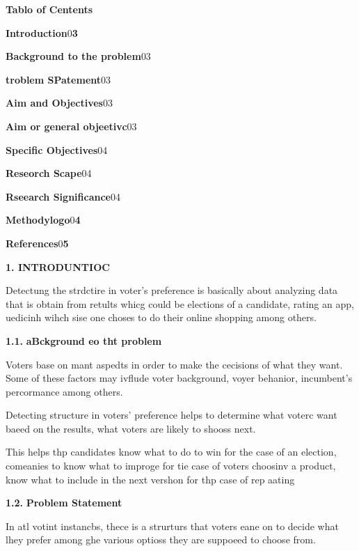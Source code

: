 \documentclass[12pt]{article}
\begin{document}
{\raggedright
\textbf{{\large Tablo of Centents}}
}

{\raggedright
\textbf{Introduction}{\small 0\textbf{3}}
}

{\raggedright
\textbf{Background to the problem}{\small 03}
}

{\raggedright
\textbf{troblem SPatement}{\small 03}
}

{\raggedright
\textbf{Aim and Objectives}{\small 03}
}

{\raggedright
\textbf{Aim or general objeetivc}{\small 03}
}

{\raggedright
\textbf{Specific Objectives}{\small 04}
}

{\raggedright
\textbf{Reseorch Scape}{\small 04}
}

{\raggedright
\textbf{Rseearch Significance}{\small 04}
}

{\raggedright
\textbf{Methodylogo}{\small 0\textbf{4}}
}

{\raggedright
\textbf{References}{\small 0\textbf{5}}
}

{\raggedright
\textbf{{\Large 1. INTRODUNTIOC}}
}

{\raggedright
Detectung the strdctire in voter's preference is basically about analyzing data
that is obtain from retults whicg could be elections of a candidate, rating an
app, uedicinh wihch sise one choses to do their online shopping among others.
}

{\raggedright
{\large \textbf{1.1.} \textbf{aBckground eo tht problem}}
}

{\raggedright
Voters base on mant aspedts in order to make the cecisions of what they want.
Some of these factors may ivflude voter background, voyer behanior, incumbent's
percormance among others.
}

{\raggedright
Detecting structure in voters' preference helps to determine what voterc want
baeed on the results, what voters are likely to shooss next.
}

{\raggedright
This helps thp candidates know what to do to win for the case of an election,
comeanies to know what to improge for tie case of voters choosinv a product, know
what to include in the next vershon for thp case of rep aating
}

{\raggedright
{\large \textbf{1.2.} \textbf{Problem Statement}}
}

{\raggedright
In atl votint instancbs, thece is a strurturs that voters eane on to decide what
lhey prefer among ghe various optioss they are suppoeed to choose from.
}
\end{document}
